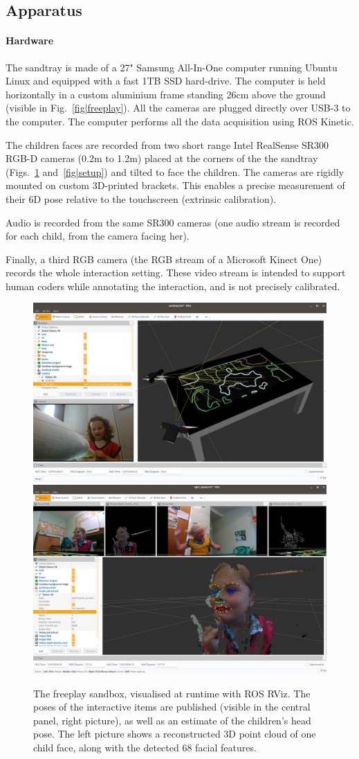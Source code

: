 \documentclass{article}
\begin{document}
\subsection{Apparatus}

\paragraph{Hardware}
The sandtray is made of a 27" Samsung All-In-One computer running Ubuntu Linux
and equipped with a fast 1TB SSD hard-drive. The computer is held horizontally in
a custom aluminium frame standing 26cm above the ground
(visible in Fig.~\ref{fig|freeplay}). All the cameras are plugged directly over
USB-3 to the computer. The computer performs all the data acquisition using ROS
Kinetic.

The children faces are recorded from two short range Intel RealSense SR300
RGB-D cameras (0.2m to 1.2m) placed at the corners of the the sandtray
(Figs.~\ref{fig|rviz} and~\ref{fig|setup}) and tilted to face the children. The
cameras are rigidly mounted on custom 3D-printed brackets. This enables a
precise measurement of their 6D pose relative to the touchscreen (extrinsic
calibration).

Audio is recorded from the same SR300 cameras (one audio stream is recorded for
each child, from the camera facing her).

Finally, a third RGB camera (the RGB stream of a Microsoft Kinect One) records
the whole interaction setting. These video stream is intended to support human
coders while annotating the interaction, and is not precisely calibrated.

\begin{figure}[ht!]
    \centering
    \includegraphics[width=0.5\linewidth]{rviz-sandtray}
    \hspace{0.2em}
    \includegraphics[width=0.48\linewidth]{3d-point-cloud-facial-features}
    \caption{The freeplay sandbox, visualised at runtime with ROS RViz. The
    poses of the interactive items are published (visible in the central panel,
    right picture), as well as an estimate of the children's head pose.  The
    left picture shows a reconstructed 3D point cloud of one child face, along
    with the detected 68 facial features.}

    \label{fig|rviz}
\end{figure}
\end{document}
